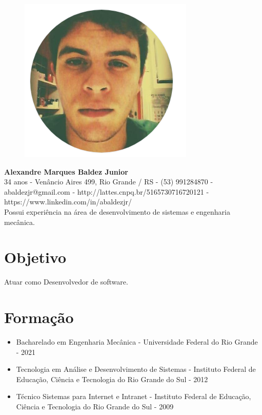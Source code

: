 \documentclass[11pt,oneside,a4paper]{article}
\begin{document}
    \thispagestyle{empty}
    \begin{figure}
        \centering
        \includegraphics[scale = 0.3]{img/perfil-red.png}        
    \end{figure}
    \begin{flushleft}
    \textbf{\Large {Alexandre Marques Baldez Junior}}\\
    \vspace{0.5cm}
    34 anos - Venâncio Aires 499, Rio Grande / RS - (53) 991284870 - abaldezjr@gmail.com - http://lattes.cnpq.br/5165730716720121 - https://www.linkedin.com/in/abaldezjr/\\
    \vspace{0.5cm}
    Possui experiência na área de desenvolvimento de sistemas e engenharia mecânica.\\
    \end{flushleft}    
    \section*{Objetivo}
    Atuar como Desenvolvedor de software.
    \section*{Formação}
    \begin{itemize}
        \item Bacharelado em Engenharia Mecânica - Universidade Federal do Rio Grande - 2021
        \item Tecnologia em Análise e Desenvolvimento de Sistemas - Instituto Federal de Educação, Ciência e Tecnologia do Rio Grande do Sul - 2012
        \item Técnico Sistemas para Internet e Intranet - Instituto Federal de Educação, Ciência e Tecnologia do Rio Grande do Sul - 2009
    \end{itemize}
\end{document}
